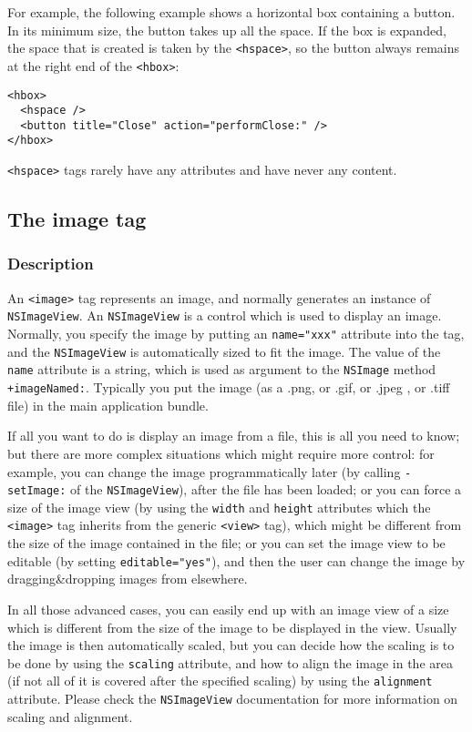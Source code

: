 For example, the following example shows a horizontal box containing
a button.  In its minimum size, the button takes up all the space.
If the box is expanded, the space that is created is taken by the
\texttt{<hspace>}, so the button always remains at the right end
of the \texttt{<hbox>}:
\begin{verbatim}
<hbox>
  <hspace />
  <button title="Close" action="performClose:" />
</hbox>
\end{verbatim}

\texttt{<hspace>} tags rarely have any attributes and have never
any content.


\subsection{The image tag}

\subsubsection{Description}
An \texttt{<image>} tag represents an image, and normally generates an
instance of \texttt{NSImageView}.  An \texttt{NSImageView} is a
control which is used to display an image.  Normally, you specify the
image by putting an \texttt{name="xxx"} attribute into the tag, and
the \texttt{NSImageView} is automatically sized to fit the image.  The
value of the \texttt{name} attribute is a string, which is used as
argument to the \texttt{NSImage} method \texttt{+imageNamed:}.
Typically you put the image (as a .png, or .gif, or .jpeg , or .tiff
file) in the main application bundle.

If all you want to do is display an image from a file, this is all you
need to know; but there are more complex situations which might
require more control: for example, you can change the image
programmatically later (by calling \texttt{-setImage:} of the
\texttt{NSImageView}), after the file has been loaded; or you can
force a size of the image view (by using the \texttt{width} and
\texttt{height} attributes which the \texttt{<image>} tag inherits 
from the generic \texttt{<view>} tag), which might be different from
the size of the image contained in the file; or you can set the image
view to be editable (by setting \texttt{editable="yes"}), and then the
user can change the image by dragging\&dropping images from elsewhere.

In all those advanced cases, you can easily end up with an image view
of a size which is different from the size of the image to be
displayed in the view.  Usually the image is then automatically
scaled, but you can decide how the scaling is to be done by using the
\texttt{scaling} attribute, and how to align the image in the area (if
not all of it is covered after the specified scaling) by using the
\texttt{alignment} attribute.  Please check the \texttt{NSImageView} 
documentation for more information on scaling and alignment.

